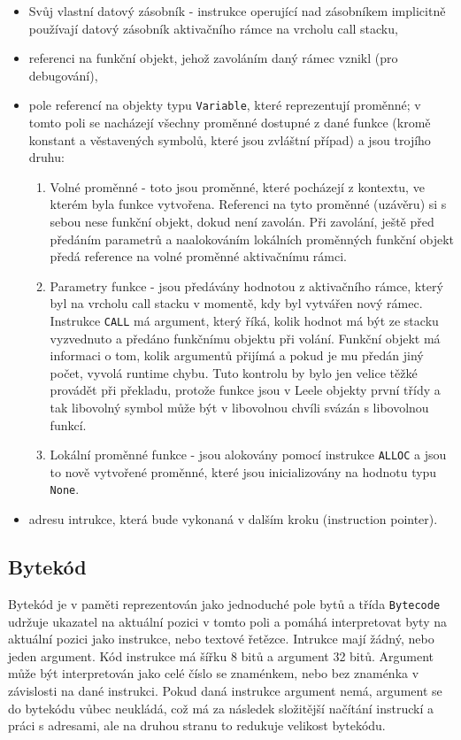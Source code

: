 \documentclass[10pt,a4paper]{article}
\begin{document}
\begin{itemize}
\item Svůj vlastní datový zásobník - instrukce operující nad zásobníkem
      implicitně používají datový zásobník aktivačního rámce na vrcholu call stacku,
\item referenci na funkční objekt, jehož zavoláním daný rámec vznikl (pro debugování),
\item pole referencí na objekty typu \texttt{Variable}, které reprezentují
      proměnné; v tomto poli se nacházejí všechny proměnné dostupné z dané funkce
	 (kromě konstant a věstavených symbolů, které jsou zvláštní případ) a jsou trojího
	 druhu:
	 \begin{enumerate}
	 \item Volné proměnné - toto jsou proměnné, které pocházejí z kontextu, ve kterém
	       byla funkce vytvořena. Referenci na tyto proměnné (uzávěru) si s sebou nese
		  funkční objekt, dokud není zavolán. Při zavolání, ještě před předáním parametrů
		  a naalokováním lokálních proměnných funkční objekt předá reference na volné
		  proměnné aktivačnímu rámci.
	 \item Parametry funkce - jsou předávány hodnotou z aktivačního rámce, který
	       byl na vrcholu call stacku v momentě, kdy byl vytvářen nový rámec.
		  Instrukce \texttt{CALL} má argument, který říká, kolik hodnot má být ze
		  stacku vyzvednuto a předáno funkčnímu objektu při volání. Funkční objekt
		  má informaci o tom, kolik argumentů přijímá a pokud je mu předán jiný počet,
		  vyvolá runtime chybu. Tuto kontrolu by bylo jen velice těžké provádět při
		  překladu, protože funkce jsou v Leele objekty první třídy a tak libovolný
		  symbol může být v libovolnou chvíli svázán s libovolnou funkcí.
	 \item Lokální proměnné funkce - jsou alokovány pomocí instrukce \texttt{ALLOC} a
	       jsou to nově vytvořené proměnné, které jsou inicializovány na hodnotu typu
		  \texttt{None}.
	 \end{enumerate}
\item adresu intrukce, která bude vykonaná v dalším kroku (instruction pointer).
\end{itemize}

\subsection{Bytekód}

Bytekód je v paměti reprezentován jako jednoduché pole bytů a třída
\texttt{Bytecode} udržuje ukazatel na aktuální pozici v tomto poli a pomáhá
interpretovat byty na aktuální pozici jako instrukce, nebo textové řetězce.
Intrukce mají žádný, nebo jeden argument. Kód instrukce má šířku 8 bitů a
argument 32 bitů. Argument může být interpretován jako celé číslo se znaménkem,
nebo bez znaménka v závislosti na dané instrukci. Pokud daná instrukce
argument nemá, argument se do bytekódu vůbec neukládá, což má za
následek složitější načítání instruckí a práci s adresami, ale na
druhou stranu to redukuje velikost bytekódu.
\end{document}
